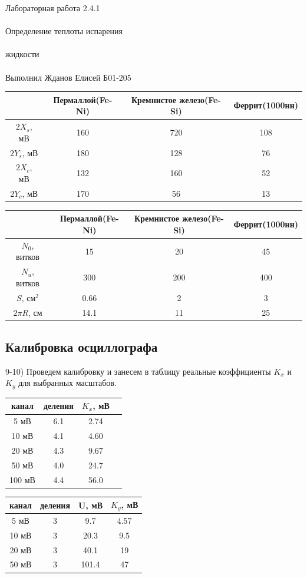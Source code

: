 \documentclass{astroedu-lab}
\begin{document}
\begin{problem}{\huge Лабораторная работа 2.4.1\\\\Определение теплоты испарения\\\\жидкости\\\\Выполнил Жданов Елисей Б01-205}
\newpage

\begin{center}
\begin{tabular}{|c|c|c|c|}
\hline
& Пермаллой(Fe-Ni) & Кремнистое железо(Fe-Si) & Феррит(1000нн) \\
\hline
$2 X_s$, мВ & 160 & 720 & 108 \\
$2 Y_s$, мВ & 180 & 128 & 76  \\
$2 X_c$, мВ & 132 & 160 & 52  \\
$2 Y_c$, мВ & 170 & 56  & 13  \\
\hline
\end{tabular}
\end{center}

\begin{center}
\begin{tabular}{|c|c|c|c|}
\hline
& Пермаллой(Fe-Ni) & Кремнистое железо(Fe-Si) & Феррит(1000нн) \\
\hline
$N_0$, витков & 15   & 20  & 45  \\
$N_u$, витков & 300  & 200 & 400 \\
$S$, см$^2$   & 0.66 & 2   & 3	 \\
$2 \pi R$, см & 14.1 & 11  & 25  \\
\hline
\end{tabular}
\end{center}

\subsection{Калибровка осциллографа}

9-10) Проведем калибровку и занесем в таблицу реальные коэффициенты $K_x$ и $K_y$ для выбранных масштабов.

\begin{center}
\begin{tabular}{|c|c|c|c|}
\hline
канал & деления & $K_x$, мВ \\
\hline
5   мВ	& 6.1	& 2.74 \\
10  мВ	& 4.1	& 4.60 \\
20  мВ 	& 4.3	& 9.67 \\
50  мВ	& 4.0	& 24.7 \\
100 мВ	& 4.4	& 56.0 \\ 
\hline
\end{tabular}
\end{center}

\begin{center}
\begin{tabular}{|c|c|c|c|}
\hline
канал & деления & U, мВ & $K_y$, мВ \\
\hline
5  мВ	& 3	& 9.7	& 4.57 \\
10 мВ	& 3	& 20.3	& 9.5  \\
20 мВ 	& 3	& 40.1	& 19   \\
50 мВ	& 3	& 101.4	& 47   \\
\hline
\end{tabular}
\end{center}


\end{problem}
\end{document}
